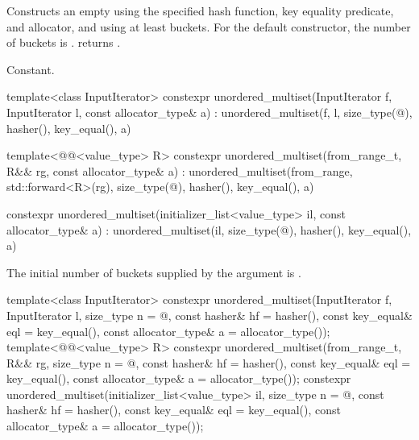 \begin{itemdescr}
\pnum
\effects
Constructs an empty  using the
specified hash function, key equality predicate, and allocator, and
using at least  buckets.  For the default constructor,
the number of buckets is .
 returns .

\pnum
\complexity
Constant.
\end{itemdescr}

%
\begin{itemdecl}
template<class InputIterator>
  constexpr unordered_multiset(InputIterator f, InputIterator l, const allocator_type& a)
    : unordered_multiset(f, l,
                         size_type(@\seebelow@), hasher(), key_equal(), a) { }

template<@@<value_type> R>
  constexpr unordered_multiset(from_range_t, R&& rg, const allocator_type& a)
    : unordered_multiset(from_range, std::forward<R>(rg),
                         size_type(@\seebelow@), hasher(), key_equal(), a) { }

constexpr unordered_multiset(initializer_list<value_type> il, const allocator_type& a)
  : unordered_multiset(il, size_type(@\seebelow@), hasher(), key_equal(), a) { }
\end{itemdecl}

\begin{itemdescr}
\pnum
\remarks
The initial number of buckets supplied by the  argument is
.
\end{itemdescr}

%
\begin{itemdecl}
template<class InputIterator>
  constexpr unordered_multiset(InputIterator f, InputIterator l,
                               size_type n = @\seebelow@, const hasher& hf = hasher(),
                               const key_equal& eql = key_equal(),
                               const allocator_type& a = allocator_type());
template<@@<value_type> R>
  constexpr unordered_multiset(from_range_t, R&& rg,
                               size_type n = @\seebelow@, const hasher& hf = hasher(),
                               const key_equal& eql = key_equal(),
                               const allocator_type& a = allocator_type());
constexpr unordered_multiset(initializer_list<value_type> il,
                             size_type n = @\seebelow@, const hasher& hf = hasher(),
                             const key_equal& eql = key_equal(),
                             const allocator_type& a = allocator_type());
\end{itemdecl}

